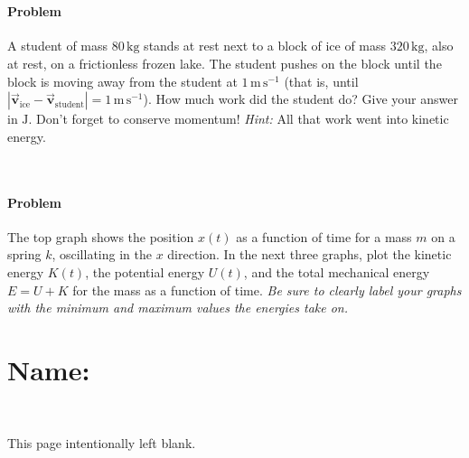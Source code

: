 \documentclass[12pt]{article}
\newcommand{\kg}{\mathrm{kg}}
\newcommand{\m}{\mathrm{m}}
\newcommand{\s}{\mathrm{s}}
\newcommand{\mps}{\m\,\s^{-1}}
\newcommand{\J}{\mathrm{J}}
\newcommand{\tv}[1]{\mathbf{\vec{#1}}}
\newcommand{\vvstudent}{\tv{v}_\mathrm{student}}
\newcommand{\vvice}{\tv{v}_\mathrm{ice}}
\newcounter{problem}
\begin{document}
~ \vfill ~

\paragraph{Problem~\theproblem}%
A student of mass $80\,\kg$ stands at rest next to a block of ice of
mass $320\,\kg$, also at rest, on a frictionless frozen lake.  The
student pushes on the block until the block is moving away from the
student at $1\,\mps$ (that is, until
$\left|\vvice-\vvstudent\right|=1\,\mps$).  How much work did the
student do?  Give your answer in $\J$.  Don't forget to conserve
momentum!  \emph{Hint:} All that work went into kinetic energy.

~ \vfill ~

\clearpage

\paragraph{Problem~\theproblem}%
The top graph shows the position $x(t)$ as a function of time for a
mass $m$ on a spring $k$, oscillating in the $x$ direction.  In the
next three graphs, plot the kinetic energy $K(t)$, the potential
energy $U(t)$, and the total mechanical energy $E=U+K$ for the mass as
a function of time.  \emph{Be sure to clearly label your graphs with the
minimum and maximum values the energies take on.}

\clearpage

\section*{Name:}

~ \vfill ~

This page intentionally left blank.

~ \vfill ~
\end{document}

